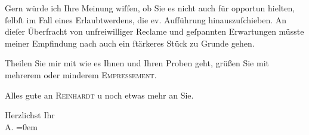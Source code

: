 \pstart
           Gern würde ich Ihre Meinung wiſſen, ob Sie es nicht auch für opportun hielten, ſelbſt
               im Fall eines Erlaubtwerdens, die \strikeout{\textcolor{gray}{Geſchichte}} ev. Aufführung
               hinauszuſchieben. An dieſer Überfracht von unfreiwilliger Reclame und geſpannten
               Erwartungen müsste meiner {\pb}Empfindung nach auch ein
               ſtärkeres Stück zu Grunde gehen.\pend
           
\pstart
           Theilen Sie mir mit wie es Ihnen und Ihren Proben geht, grüßen Sie mit mehrerem oder minderem \textsc{Empressement}.\pend
           
\pstart
           Alles gute an \textsc{Reinhardt} u noch etwas mehr an Sie.\pend
           
\pstart
           Herzlichst Ihr{\\[\baselineskip]}\spacefill\mbox{A.}\pend
           \leftskip=0em{}\endnumbering{}  
      